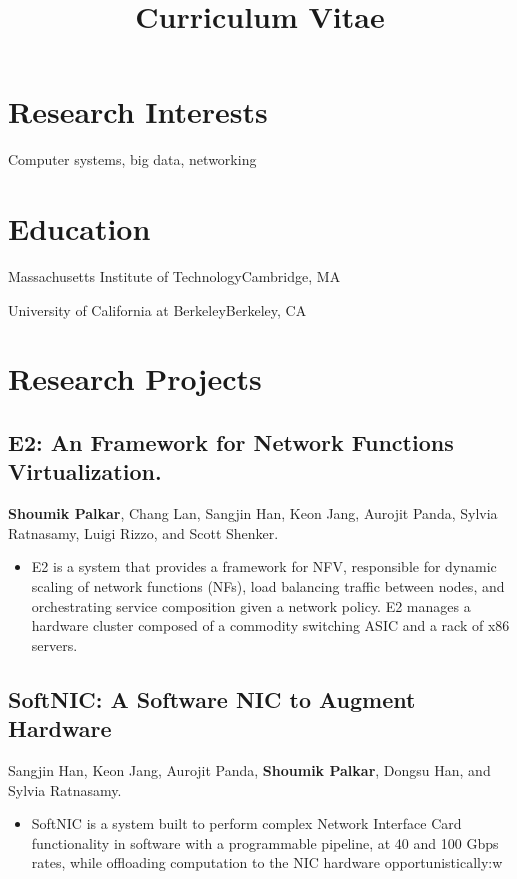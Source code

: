 \documentclass[11pt,letterpaper,sans]{moderncv}
\title{Curriculum Vitae}
\begin{document}
\makecvtitle
\section{Research Interests}
Computer systems, big data, networking

\section{Education}
{Massachusetts Institute of Technology}{Cambridge, MA}{}{}

{University of California at Berkeley}{Berkeley, CA}{}{}

\section{Research Projects}
\subsection{E2: An Framework for Network Functions Virtualization.}
\cvitem {}
{
    \textbf{Shoumik Palkar}, Chang Lan, Sangjin Han, Keon Jang, Aurojit Panda, Sylvia Ratnasamy,
    Luigi Rizzo, and Scott Shenker.
    \begin{itemize}
        \item E2 is a system that provides a framework for NFV, responsible for dynamic scaling
        of network functions (NFs), load balancing traffic between nodes, and orchestrating
        service composition given a network policy. E2 manages a hardware cluster composed of a
        commodity switching ASIC and a rack of x86 servers.
    \end{itemize}
}

    \subsection{SoftNIC: A Software NIC to Augment Hardware}
    \cvitem{}
    {
        Sangjin Han, Keon Jang, Aurojit Panda, \textbf{Shoumik Palkar}, Dongsu Han, and Sylvia Ratnasamy.
        \begin{itemize}
            \item SoftNIC is a system built to perform complex Network Interface Card functionality in
            software with a programmable pipeline, at 40 and 100 Gbps rates, while offloading
            computation to the NIC hardware opportunistically:w
        \end{itemize}
    }
\end{document}
